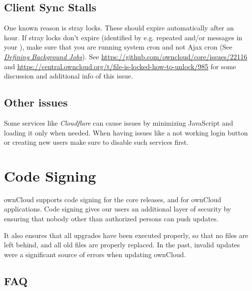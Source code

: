 \documentclass[letterpaper,10pt,english]{sphinxmanual}
\begin{document}
\subsection{Client Sync Stalls}
\label{issues/general_troubleshooting:client-sync-stalls}
One known reason is stray locks. These should expire automatically after an hour. If stray
locks don't expire (identified by e.g. repeated  and/or 
messages in your ), make sure that you are running system cron and
not Ajax cron (See {\hyperref[configuration_server/background_jobs_configuration::doc]{\emph{Defining Background Jobs}}}).
See \href{https://github.com/owncloud/core/issues/22116}{https://github.com/owncloud/core/issues/22116} and \href{https://central.owncloud.org/t/file-is-locked-how-to-unlock/985}{https://central.owncloud.org/t/file-is-locked-how-to-unlock/985}
for some discussion and additional info of this issue.


\subsection{Other issues}
\label{issues/general_troubleshooting:other-issues}
Some services like \emph{Cloudflare} can cause issues by minimizing JavaScript
and loading it only when needed. When having issues like a not working
login button or creating new users make sure to disable such services
first.


\section{Code Signing}
\label{issues/code_signing:code-signing}\label{issues/code_signing::doc}\label{issues/code_signing:code-signing-label}
ownCloud supports code signing for the core releases, and for ownCloud
applications. Code signing gives our users an additional layer of security by
ensuring that nobody other than authorized persons can push updates.

It also ensures that all upgrades have been executed properly, so that no files
are left behind, and all old files are properly replaced. In the past, invalid
updates were a significant source of errors when updating ownCloud.


\subsection{FAQ}
\label{issues/code_signing:faq}
\end{document}
